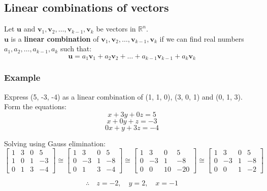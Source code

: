 \documentclass[11pt]{article}
\begin{document}
\subsection{Linear combinations of vectors}
\label{sec:org7121180}
Let \(\boldsymbol{u}\) and \(\boldsymbol{v}_1, \boldsymbol{v}_2, \ldots, \boldsymbol{v}_{k-1}, \boldsymbol{v}_k\) be vectors in \(\mathbb{R}^n\).
\\[0pt]

\(\boldsymbol{u}\) is a \textbf{linear combination} of \(\boldsymbol{v}_1, \boldsymbol{v}_2, \ldots, \boldsymbol{v}_{k-1}, \boldsymbol{v}_k\) if we can find real numbers \(a_1, a_2, \ldots, a_{k-1}, a_k\) such that:
\[\boldsymbol{u} = a_1 \boldsymbol{v}_1 + a_2  \boldsymbol{v}_2 + \ldots + a_{k-1} \boldsymbol{v}_{k-1} + a_k \boldsymbol{v}_k\]

\subsubsection{Example}
\label{sec:org3a52cfc}
Express (5, -3, -4) as a linear combination of (1, 1, 0), (3, 0, 1) and (0, 1, 3).
\\[0pt]

Form the equations:
\[x + 3y + 0z = 5\]
\[x + 0y + z = -3\]
\[0x + y + 3z = -4\]

Solving using Gauss elimination:
\begin{displaymath}
\begin{bmatrix}
1 & 3 & 0 & 5 \\
1 & 0 & 1 & -3 \\
0 & 1 & 3 & -4
\end{bmatrix} \cong \begin{bmatrix}
1 & 3 & 0 & 5 \\
0 & -3 & 1 & -8 \\
0 & 1 & 3 & -4
\end{bmatrix} \cong \begin{bmatrix}
1 & 3 & 0 & 5 \\
0 & -3 & 1 & -8 \\
0 & 0 & 10 & -20
\end{bmatrix} \cong \begin{bmatrix}
1 & 3 & 0 & 5 \\
0 & -3 & 1 & -8 \\
0 & 0 & 1 & -2
\end{bmatrix}
\end{displaymath}

\[\therefore \quad z = -2, \quad y = 2, \quad x = -1\]
\end{document}

